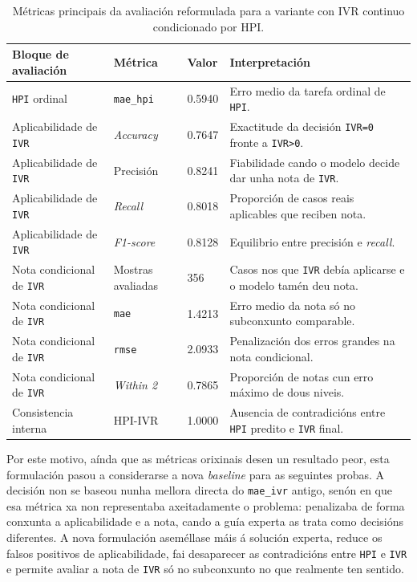 {
\begin{table}[htbp]
    \centering
    \footnotesize
    \setlength{\tabcolsep}{4pt}
    \begin{tabular}{p{}|p{}|p{}|p{}}
        \rowcolor{udcpink!25}
        \textbf{Bloque de avaliación} & \textbf{Métrica} & \textbf{Valor} & \textbf{Interpretación} \\\hline
        \texttt{HPI} ordinal & \texttt{mae\_hpi} & 0.5940 & Erro medio da tarefa ordinal de \texttt{HPI}. \\
        Aplicabilidade de \texttt{IVR} & \textit{Accuracy} & 0.7647 & Exactitude da decisión \texttt{IVR=0} fronte a \texttt{IVR>0}. \\
        Aplicabilidade de \texttt{IVR} & Precisión & 0.8241 & Fiabilidade cando o modelo decide dar unha nota de \texttt{IVR}. \\
        Aplicabilidade de \texttt{IVR} & \textit{Recall} & 0.8018 & Proporción de casos reais aplicables que reciben nota. \\
        Aplicabilidade de \texttt{IVR} & \textit{F1-score} & 0.8128 & Equilibrio entre precisión e \textit{recall}. \\
        Nota condicional de \texttt{IVR} & Mostras avaliadas & 356 & Casos nos que \texttt{IVR} debía aplicarse e o modelo tamén deu nota. \\
        Nota condicional de \texttt{IVR} & \texttt{mae} & 1.4213 & Erro medio da nota só no subconxunto comparable. \\
        Nota condicional de \texttt{IVR} & \texttt{rmse} & 2.0933 & Penalización dos erros grandes na nota condicional. \\
        Nota condicional de \texttt{IVR} & \textit{Within 2} & 0.7865 & Proporción de notas cun erro máximo de dous niveis. \\
        Consistencia interna & HPI-IVR & 1.0000 & Ausencia de contradicións entre \texttt{HPI} predito e \texttt{IVR} final. \\
    \end{tabular}
    \caption{Métricas principais da avaliación reformulada para a variante con IVR continuo condicionado por HPI.}
    \label{tab:metricas-test-logica-experta}
\end{table}
}

Por este motivo, aínda que as métricas orixinais desen un resultado peor, esta formulación pasou a
considerarse a nova \textit{baseline} para as seguintes probas. A decisión non se baseou nunha
mellora directa do \texttt{mae\_ivr} antigo, senón en que esa métrica xa non representaba
axeitadamente o problema: penalizaba de forma conxunta a aplicabilidade e a nota, cando a guía
experta as trata como decisións diferentes. A nova formulación aseméllase máis á solución experta,
reduce os falsos positivos de aplicabilidade, fai desaparecer as contradicións entre \texttt{HPI} e
\texttt{IVR} e permite avaliar a nota de \texttt{IVR} só no subconxunto no que realmente ten sentido.


